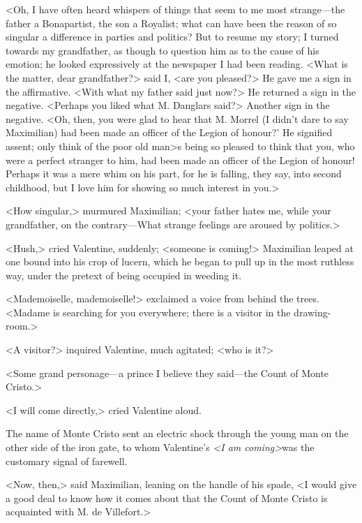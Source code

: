  <Oh, I have often heard whispers of things that seem to me most strange—the father a Bonapartist, the son a Royalist; what can have been the reason of so singular a difference in parties and politics? But to resume my story; I turned towards my grandfather, as though to question him as to the cause of his emotion; he looked expressively at the newspaper I had been reading. <What is the matter, dear grandfather?> said I, <are you pleased?> He gave me a sign in the affirmative. <With what my father said just now?> He returned a sign in the negative. <Perhaps you liked what M. Danglars said?> Another sign in the negative. <Oh, then, you were glad to hear that M. Morrel (I didn't dare to say Maximilian) had been made an officer of the Legion of honour?' He signified assent; only think of the poor old man>s being so pleased to think that you, who were a perfect stranger to him, had been made an officer of the Legion of honour! Perhaps it was a mere whim on his part, for he is falling, they say, into second childhood, but I love him for showing so much interest in you.> 

 <How singular,> murmured Maximilian; <your father hates me, while your grandfather, on the contrary—What strange feelings are aroused by politics.> 

 <Hush,> cried Valentine, suddenly; <someone is coming!> Maximilian leaped at one bound into his crop of lucern, which he began to pull up in the most ruthless way, under the pretext of being occupied in weeding it. 

 <Mademoiselle, mademoiselle!> exclaimed a voice from behind the trees. <Madame is searching for you everywhere; there is a visitor in the drawing-room.> 

 <A visitor?> inquired Valentine, much agitated; <who is it?> 

 <Some grand personage—a prince I believe they said—the Count of Monte Cristo.> 

 <I will come directly,> cried Valentine aloud. 

 The name of Monte Cristo sent an electric shock through the young man on the other side of the iron gate, to whom Valentine's \textit{<I am coming>}was the customary signal of farewell. 

 <Now, then,> said Maximilian, leaning on the handle of his spade, <I would give a good deal to know how it comes about that the Count of Monte Cristo is acquainted with M. de Villefort.> 